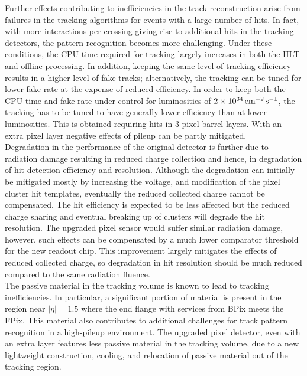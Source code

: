 Further effects contributing to inefficiencies in the track reconstruction arise from failures in the tracking algorithms for events with a large number of hits. In fact, with more interactions per crossing giving rise to additional hits in the tracking detectors, the pattern recognition becomes more challenging. Under these conditions, the CPU time required for tracking largely increases in both the HLT and offline processing. In addition, keeping the same level of tracking efficiency results in a higher level of fake tracks; alternatively, the tracking can be tuned for lower fake rate at the expense of reduced efficiency.
In order to keep both the CPU time and fake rate under control for luminosities of $2\times10^{34}\,\text{cm}^\text{$-$2}\,\text{s}^\text{$-$1}$, the tracking has to be tuned to have generally lower efficiency than at lower luminosities. This is obtained requiring hits in 3 pixel barrel layers. With an extra pixel layer negative effects of pileup can be partly mitigated.\\

Degradation in the performance of the original detector is further due to radiation damage resulting in reduced charge collection and hence, in degradation of hit detection efficiency and resolution.
Although the degradation can initially be mitigated mostly by increasing the voltage, and modification of the pixel cluster hit templates, eventually the reduced collected charge cannot be compensated.
The hit efficiency is expected to be less affected but the reduced charge sharing and eventual breaking up of clusters will degrade the hit resolution. The upgraded pixel sensor would suffer similar radiation damage, however, such effects can be compensated by a much lower comparator threshold for the new readout chip. This improvement largely mitigates the effects of reduced collected charge, so degradation in hit resolution should be much reduced compared to the same radiation fluence.\\

The passive material in the tracking volume is known to lead to tracking inefficiencies.
In particular, a significant portion of material is present in the region near $|\eta| = 1.5$ where the end flange with services from BPix meets the FPix.
This material also contributes to additional challenges for track pattern recognition in a high-pileup environment.
The upgraded pixel detector, even with an extra layer features less passive material in the tracking volume, due to a new lightweight construction, cooling, and relocation of passive material out of the tracking region.

